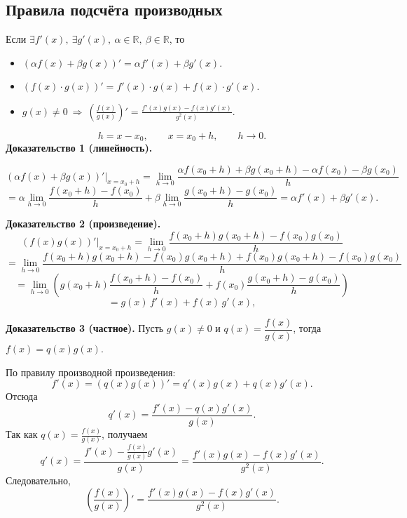 \subsection{Правила подсчёта производных}
\begin{lemma}[Правила:]
Если $\exists f'(x),\ \exists g'(x),\ \alpha\in\mathbb{R},\ \beta\in\mathbb{R}$, то
\begin{itemize}
\item $(\alpha f(x)+\beta g(x))'=\alpha f'(x)+\beta g'(x)$.
\item $(f(x)\cdot g(x))'=f'(x)\cdot g(x)+f(x)\cdot g'(x)$.
\item $g(x)\ne 0 \ \Longrightarrow\ \left(\frac{f(x)}{g(x)}\right)'=
\frac{f'(x)g(x)-f(x)g'(x)}{g^2(x)}$.
\end{itemize}
\end{lemma}

\begin{Proof}
\[
h=x-x_0,\qquad x=x_0+h,\qquad h\to 0.
\]
\textbf{Доказательство 1 (линейность).}

\[
(\alpha f(x)+\beta g(x))'\big|_{x=x_0 + h}
=\lim_{h\to 0}\frac{\alpha f(x_0+h)+\beta g(x_0+h)-\alpha f(x_0)-\beta g(x_0)}{h}
\]
\[
=\alpha\lim_{h\to 0}\frac{f(x_0+h)-f(x_0)}{h}
+\beta\lim_{h\to 0}\frac{g(x_0+h)-g(x_0)}{h}
=\alpha f'(x)+\beta g'(x).
\]

\bigskip

\textbf{Доказательство 2 (произведение).}
\[
(f(x)g(x))'\big|_{x=x_0 + h}
=\lim_{h\to 0}\frac{f(x_0+h)g(x_0+h)-f(x_0)g(x_0)}{h}
\]
\[
=\lim_{h\to 0}\frac{f(x_0+h)g(x_0+h)-f(x_0)g(x_0+h)+f(x_0)g(x_0+h)-f(x_0)g(x_0)}{h}
\]
\[
=\lim_{h\to 0}\left(
g(x_0+h)\frac{f(x_0+h)-f(x_0)}{h}
+f(x_0)\frac{g(x_0+h)-g(x_0)}{h}
\right)
\]
\[
=g(x)\,f'(x)+f(x)\,g'(x),
\]


\bigskip

\textbf{Доказательство 3 (частное).}
Пусть $g(x)\ne 0$ и $q(x)=\dfrac{f(x)}{g(x)}$, тогда $f(x)=q(x)g(x)$.

По правилу производной произведения:
\[
f'(x)=(q(x)g(x))'=q'(x)g(x)+q(x)g'(x).
\]
Отсюда
\[
q'(x)=\frac{f'(x)-q(x)g'(x)}{g(x)}.
\]
Так как $q(x)=\frac{f(x)}{g(x)}$, получаем
\[
q'(x)=\frac{f'(x)-\frac{f(x)}{g(x)}g'(x)}{g(x)}
=\frac{f'(x)g(x)-f(x)g'(x)}{g^2(x)}.
\]
Следовательно,
\[
\left(\frac{f(x)}{g(x)}\right)'=\frac{f'(x)g(x)-f(x)g'(x)}{g^2(x)}.
\]
\end{Proof}
